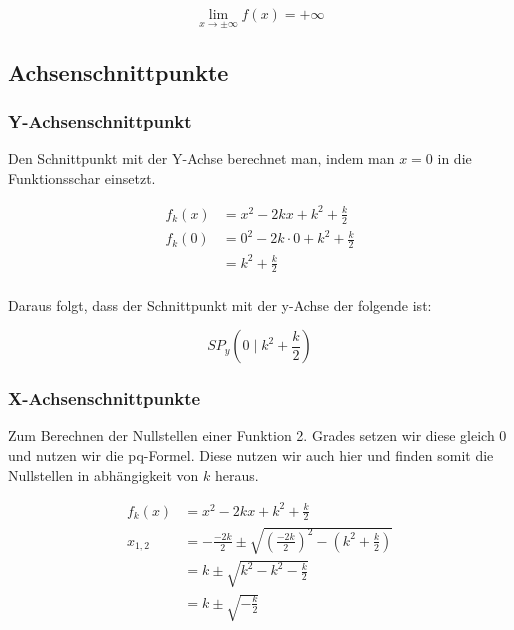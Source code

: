 \documentclass[12pt,a4paper]{article}
\begin{document}
\begin{equation}
    \label{eq:lim}
    \lim_{x \to \pm \infty} f(x) = + \infty
\end{equation}

\subsection{Achsenschnittpunkte}

\subsubsection{Y-Achsenschnittpunkt}

Den Schnittpunkt mit der Y-Achse berechnet man, indem man $x=0$ in die Funktionsschar einsetzt. 

\begin{equation}
    \label{eq:spyc}
    \begin{aligned}
        f_k(x)&= x^2 - 2kx + k^2 + \frac{k}{2} \\
        f_k(0)&= 0^2 - 2k \cdot 0 + k^2 + \frac{k}{2} \\
        &= k^2 + \frac{k}{2} \\
    \end{aligned}
\end{equation}

Daraus folgt, dass der Schnittpunkt mit der y-Achse der folgende ist:

\begin{equation}
    \label{eq:spy}
    SP_y(0 \mid k^2 + \frac{k}{2})
\end{equation}

\subsubsection {X-Achsenschnittpunkte}

Zum Berechnen der Nullstellen einer Funktion 2. Grades setzen wir diese gleich 0 und nutzen wir die pq-Formel. Diese nutzen wir auch hier und finden somit die Nullstellen in abhängigkeit von $k$ heraus.

\begin{equation}
    \label{eq:pqf}
    \begin{aligned}
        f_k(x)&= x^2 - 2kx + k^2 + \frac{k}{2} \\
        x_{1,2} &= -\frac{-2k}{2} \pm \sqrt{(\frac{-2k}{2})^2 - (k^2 + \frac{k}{2})} \\
        &= k \pm \sqrt{k^2 - k^2 - \frac{k}{2}} \\
        &= k \pm \sqrt{- \frac{k}{2}} \\
    \end{aligned}
\end{equation}
\end{document}
